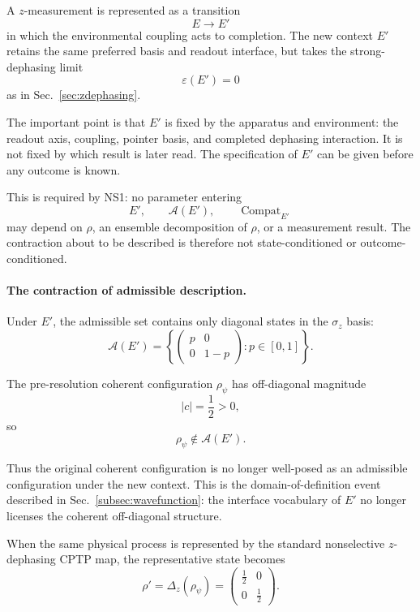 \documentclass[aps,prx,onecolumn,11pt]{revtex4-2}
\theoremstyle{plain}
\theoremstyle{definition}
\theoremstyle{remark}
\newcommand{\Compat}{\operatorname{Compat}} %
\begin{document}
A \(z\)-measurement is represented as a transition
\[
E\to E'
\]
in which the environmental coupling acts to completion. The new context
\(E'\) retains the same preferred basis and readout interface, but takes
the strong-dephasing limit
\[
\varepsilon(E')=0
\]
as in Sec.~\ref{sec:zdephasing}.

The important point is that \(E'\) is fixed by the apparatus and
environment: the readout axis, coupling, pointer basis, and completed
dephasing interaction. It is not fixed by which result is later read.
The specification of \(E'\) can be given before any outcome is known.

This is required by NS1: no parameter entering
\[
E',
\qquad
\mathcal A(E'),
\qquad
\Compat_{E'}
\]
may depend on \(\rho\), an ensemble decomposition of \(\rho\), or a
measurement result. The contraction about to be described is therefore
not state-conditioned or outcome-conditioned.

\paragraph{The contraction of admissible description.}

Under \(E'\), the admissible set contains only diagonal states in the
\(\sigma_z\) basis:
\[
\mathcal A(E')
=
\left\{
\begin{pmatrix}
p & 0\\
0 & 1-p
\end{pmatrix}
:
p\in[0,1]
\right\}.
\]

The pre-resolution coherent configuration \(\rho_\psi\) has
off-diagonal magnitude
\[
|c|=\frac12>0,
\]
so
\[
\rho_\psi\notin\mathcal A(E').
\]

Thus the original coherent configuration is no longer well-posed as an
admissible configuration under the new context. This is the
domain-of-definition event described in Sec.~\ref{subsec:wavefunction}:
the interface vocabulary of \(E'\) no longer licenses the coherent
off-diagonal structure.

When the same physical process is represented by the standard
nonselective \(z\)-dephasing CPTP map, the representative state becomes
\begin{equation}
\rho'
=
\Delta_z(\rho_\psi)
=
\begin{pmatrix}
\tfrac12 & 0 \\[2pt]
0 & \tfrac12
\end{pmatrix}.
\label{eq:appendixE_nonselective_dephased_state}
\end{equation}
\end{document}
